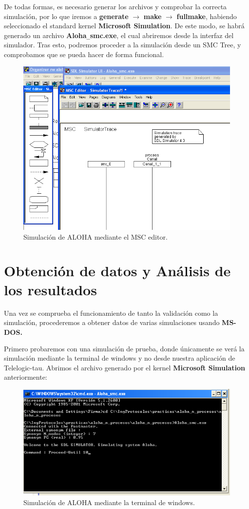 \documentclass{article}
\begin{document}
\quad

De todas formas, es necesario generar los archivos y comprobar la correcta simulación, por lo que iremos a \textbf{generate} $\rightarrow$ \textbf{make} $\rightarrow$ \textbf{fullmake}, habiendo seleccionado el standard kernel \textbf{Microsoft Simulation}. De este modo, se habrá generado un archivo \textbf{Aloha}\verb|_|\textbf{smc.exe}, el cual abriremos desde la interfaz del simulador. Tras esto, podremos proceder a la simulación desde un SMC Tree, y comprobamos que se pueda hacer de forma funcional.

\begin{figure}[h]
    \centering
    \includegraphics[width=0.7\linewidth]{src/SimulatorTree.png}
    \caption{\label{fig:SimulatorTree} Simulación de ALOHA mediante el MSC editor.}
\end{figure}

\section{Obtención de datos y Análisis de los resultados}

Una vez se comprueba el funcionamiento de tanto la validación como la simulación, procederemos a obtener datos de varias simulaciones usando \textbf{MS-DOS.}

Primero probaremos con una simulación de prueba, donde únicamente se verá la simulación mediante la terminal de windows y no desde nuestra aplicación de Telelogic-tau. Abrimos el archivo generado por el kernel \textbf{Microsoft Simulation} anteriormente:

\quad

\begin{figure}[h]
    \centering
    \includegraphics[width=0.85\linewidth]{src/cmd.png}
    \caption{\label{fig:cmdcaptura} Simulación de ALOHA mediante la terminal de windows.}
\end{figure}
\end{document}
